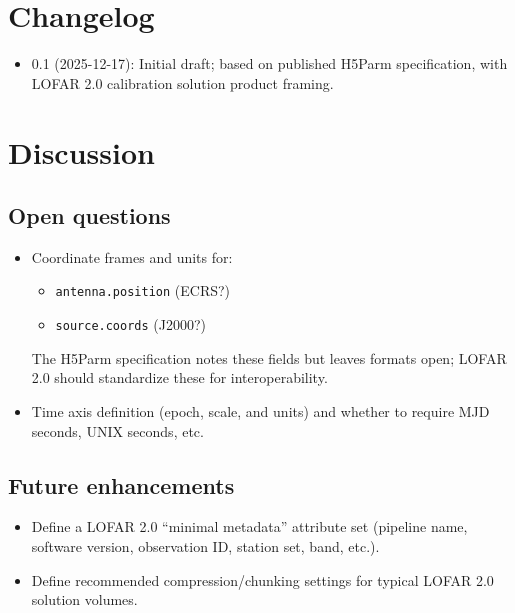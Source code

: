 \documentclass[a4paper,10pt,bibtotoc]{scrartcl}
\begin{document}

\section{Changelog}
\label{sec:changelog}

\begin{itemize}
  \item 0.1 (2025-12-17): Initial draft; based on published H5Parm specification, with LOFAR 2.0 calibration solution product framing. 
\end{itemize}


\section{Discussion}
\label{sec:discussion}

\subsection{Open questions}
\label{sec:open-questions}
\begin{itemize}
  \item Coordinate frames and units for:
    \begin{itemize}
      \item \texttt{antenna.position} (ECRS?)
      \item \texttt{source.coords} (J2000?)
    \end{itemize}
    The H5Parm specification notes these fields but leaves formats open; LOFAR 2.0 should standardize these for interoperability. 
  \item Time axis definition (epoch, scale, and units) and whether to require MJD seconds, UNIX seconds, etc.
\end{itemize}

\subsection{Future enhancements}
\label{sec:future-enhancements}
\begin{itemize}
  \item Define a LOFAR 2.0 ``minimal metadata'' attribute set (pipeline name, software version, observation ID, station set, band, etc.).
  \item Define recommended compression/chunking settings for typical LOFAR 2.0 solution volumes.
\end{itemize}

\end{document}

